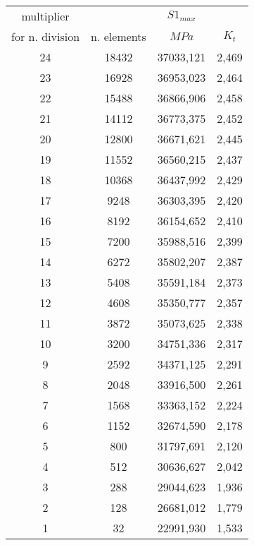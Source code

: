 \begin{tabular}{cccc}
 \hline
  multiplier	  &				&	$S1_{max}$\\
  for n. division & n. elements &   $MPa$	&  $K_{t}$\\
 \hline
  24 &      18432 &           37033,121   &            2,469\\
  23 &      16928 &           36953,023   &            2,464\\
  22 &      15488 &           36866,906   &            2,458\\
  21 &      14112 &           36773,375   &            2,452\\
  20 &      12800 &           36671,621   &            2,445\\
  19 &      11552 &           36560,215   &            2,437\\
  18 &      10368 &           36437,992   &            2,429\\
  17 &       9248 &           36303,395   &            2,420\\
  16 &       8192 &           36154,652   &            2,410\\
  15 &       7200 &           35988,516   &            2,399\\
  14 &       6272 &           35802,207   &            2,387\\
  13 &       5408 &           35591,184   &            2,373\\
  12 &       4608 &           35350,777   &            2,357\\
  11 &       3872 &           35073,625   &            2,338\\
  10 &       3200 &           34751,336   &            2,317\\
   9 &       2592 &           34371,125   &            2,291\\
   8 &       2048 &           33916,500   &            2,261\\
   7 &       1568 &           33363,152   &            2,224\\
   6 &       1152 &           32674,590   &            2,178\\
   5 &        800 &           31797,691   &            2,120\\
   4 &        512 &           30636,627   &            2,042\\
   3 &        288 &           29044,623   &            1,936\\
   2 &        128 &           26681,012   &            1,779\\
   1 &         32 &           22991,930   &            1,533\\
 \hline
\end{tabular}